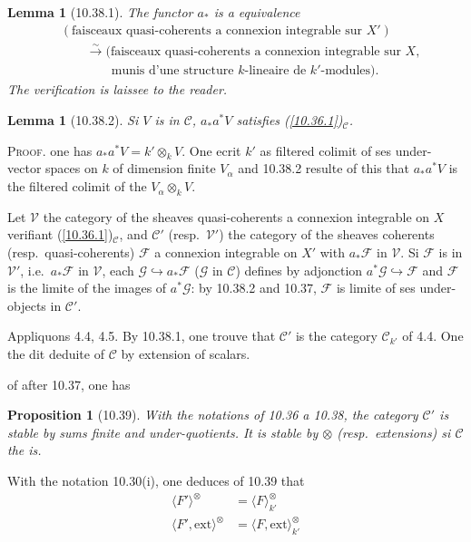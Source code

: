 \documentclass[12pt,a4paper]{article}
\theoremstyle{plain}
\newtheorem{lemma}[theorem]{Lemma}
\newtheorem{proposition}[theorem]{Proposition}
\theoremstyle{definition}
\theoremstyle{remark}
\newcommand{\ext}{\mathrm{ext}}
\begin{document}
\begin{lemma}[10.38.1]
The functor $a_*$ is a equivalence
\begin{align*}
&(\text{faisceaux quasi-coherents a connexion integrable sur } X') \\
&\qquad \xrightarrow{\sim} (\text{faisceaux quasi-coherents a connexion integrable sur } X, \\
&\qquad\qquad \text{munis d'une structure } k\text{-lineaire de } k'\text{-modules}).
\end{align*}
The verification is laissee to the reader.
\end{lemma}

\begin{lemma}[10.38.2]
Si $V$ is in $\mathcal{C}$, $a_* a^* V$ satisfies (\ref{10.36.1})$_{\mathcal{C}}$.
\end{lemma}

\textsc{Proof.} one has $a_* a^* V = k' \otimes_k V$. One ecrit $k'$ as filtered colimit of ses under-vector spaces on $k$ of dimension finite $V_\alpha$ and 10.38.2 resulte of this that $a_* a^* V$ is the filtered colimit of the $V_\alpha \otimes_k V$.

Let $\mathcal{V}$ the category of the sheaves quasi-coherents a connexion integrable on $X$ verifiant (\ref{10.36.1})$_{\mathcal{C}}$, and $\mathcal{C}'$ (resp.~$\mathcal{V}'$) the category of the sheaves coherents (resp.~quasi-coherents) $\mathcal{F}$ a connexion integrable on $X'$ with $a_* \mathcal{F}$ in $\mathcal{V}$. Si $\mathcal{F}$ is in $\mathcal{V}'$, i.e.~$a_* \mathcal{F}$ in $\mathcal{V}$, each $\mathcal{G} \hookrightarrow a_* \mathcal{F}$ ($\mathcal{G}$ in $\mathcal{C}$) defines by adjonction $a^* \mathcal{G} \hookrightarrow \mathcal{F}$ and $\mathcal{F}$ is the limite of the images of $a^* \mathcal{G}$: by 10.38.2 and 10.37, $\mathcal{F}$ is limite of ses under-objects in $\mathcal{C}'$.

Appliquons 4.4, 4.5. By 10.38.1, one trouve that $\mathcal{C}'$ is the category $\mathcal{C}_{k'}$ of 4.4. One the dit deduite of $\mathcal{C}$ by extension of scalars.

of after 10.37, one has
\begin{proposition}[10.39]
With the notations of 10.36 a 10.38, the category $\mathcal{C}'$ is stable by sums finite and under-quotients. It is stable by $\otimes$ (resp.~extensions) si $\mathcal{C}$ the is.
\end{proposition}

With the notation 10.30(i), one deduces of 10.39 that
\begin{align}
\langle F' \rangle^{\otimes} &= \langle F \rangle^{\otimes}_{k'} \label{10.39.1} \\
\langle F', \ext \rangle^{\otimes} &= \langle F, \ext \rangle^{\otimes}_{k'} \label{10.39.2}
\end{align}
\end{document}
